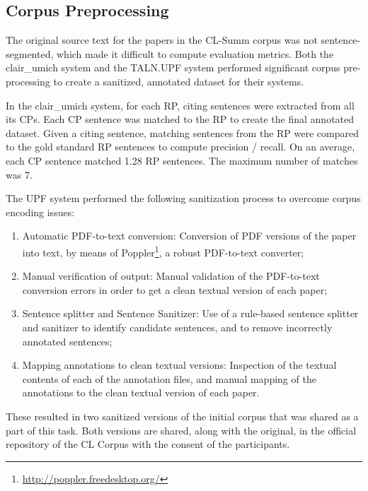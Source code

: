 \documentclass[11pt]{article}
\begin{document}
\subsection{Corpus Preprocessing}
The original source text for the papers in the CL-Summ corpus was not
sentence-segmented, which made it difficult to compute evaluation
metrics. Both the clair\_umich system and the TALN.UPF system
performed significant corpus pre-processing to create a sanitized,
annotated dataset for their systems.

In the clair\_umich system, for each RP, citing sentences were
extracted from all its CPs.  Each CP sentence was matched to the RP to
create the final annotated dataset. Given a citing sentence, matching
sentences from the RP were compared to the gold standard RP sentences
to compute precision / recall.  On an average, each CP sentence
matched 1.28 RP sentences. The maximum number of matches was 7.

The UPF system performed the following sanitization process to
overcome corpus encoding issues:

\begin{enumerate}
\vspace{-.3cm}
\item {Automatic PDF-to-text conversion}: Conversion of PDF versions
  of the paper into text, by means of
  Poppler\footnote{\url{http://poppler.freedesktop.org/}}, a robust
  PDF-to-text converter;
\vspace{-.3cm}
\item {Manual verification of output}: Manual validation of the
  PDF-to-text conversion errors in order to get a clean textual
  version of each paper;
\vspace{-.6cm}
\item {Sentence splitter and Sentence Sanitizer}: Use of a rule-based
  sentence splitter and sanitizer to identify candidate sentences, and
  to remove incorrectly annotated sentences;
\vspace{-.3cm}
\item {Mapping annotations to clean textual versions}: Inspection of
  the textual contents of each of the annotation files, and manual
  mapping of the annotations to the clean textual version of each
  paper.
\end{enumerate}

These resulted in two sanitized versions of the initial corpus that
was shared as a part of this task. Both versions are shared, along
with the original, in the official repository of the CL Corpus with
the consent of the participants.
\end{document}
